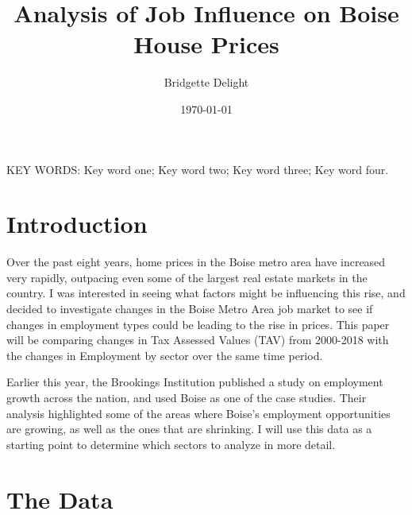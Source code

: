 \documentclass{article}
\title{\textbf{Analysis of Job Influence on Boise House Prices}}
\author{\vspace{11pt}Bridgette Delight}
\affil[1]{Department of Mathematics, Boise State University, Boise, Idaho 83725}
\affil[2]{Department of Computer Science, Boise State University, Boise, Idaho 83725}
\date{\today}
\begin{document}

\maketitle

\begin{abstract}

\end{abstract}

\vspace{8pt}
\noindent
KEY WORDS: Key word one; Key word two; Key word three; Key word four.

\section{Introduction}
Over the past eight years, home prices in the Boise metro area have increased very rapidly, outpacing even some of the largest real estate markets in the country. I was interested in seeing what factors might be influencing this rise, and decided to investigate changes in the Boise Metro Area job market to see if changes in employment types could be leading to the rise in prices. This paper will be comparing changes in Tax Assessed Values (TAV) from 2000-2018 with the changes in Employment by sector over the same time period. 

Earlier this year, the Brookings Institution published a study on employment growth across the nation, and used Boise as one of the case studies. Their analysis highlighted some of the areas where Boise's employment opportunities are growing, as well as the ones that are shrinking. I will use this data as a starting point to determine which sectors to analyze in more detail.



\section{The Data}
\end{document}
